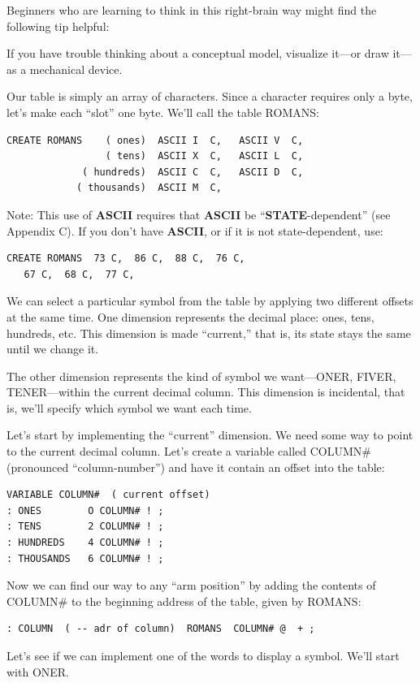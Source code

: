 Beginners who are learning to think in this right-brain way might
find the following tip helpful:

\begin{tip}
If you have trouble thinking about a conceptual model, visualize it---or
draw it---as a mechanical device.
\end{tip}
Our table is simply an array of characters. Since a character requires only
a byte, let's make each ``slot'' one byte. We'll call the table ROMANS:

\begin{verbatim}
CREATE ROMANS    ( ones)  ASCII I  C,   ASCII V  C,
                 ( tens)  ASCII X  C,   ASCII L  C,
             ( hundreds)  ASCII C  C,   ASCII D  C,
            ( thousands)  ASCII M  C,
\end{verbatim}
Note: This use of \textbf{ASCII} requires that \textbf{ASCII} be
``\textbf{STATE}-dependent'' (see Appendix C). If you don't have \textbf{ASCII},
or if it is not state-dependent, use:

\begin{verbatim}
CREATE ROMANS  73 C,  86 C,  88 C,  76 C,
   67 C,  68 C,  77 C,
\end{verbatim}

We can select a particular symbol from the table by applying two
different offsets at the same time. One dimension represents the decimal
place: ones, tens, hundreds, etc. This dimension is made ``current,'' that
is, its state stays the same until we change it.

The other dimension represents the kind of symbol we want---ONER,
FIVER, TENER---within the current decimal column. This
dimension is incidental, that is, we'll specify which symbol we want each
time.

Let's start by implementing the ``current'' dimension. We need
some way to point to the current decimal column. Let's create a variable
called COLUMN\# (pronounced ``column-number'') and have it contain an
offset into the table:

\begin{verbatim}
VARIABLE COLUMN#  ( current offset)
: ONES        O COLUMN# ! ;
: TENS        2 COLUMN# ! ;
: HUNDREDS    4 COLUMN# ! ;
: THOUSANDS   6 COLUMN# ! ;
\end{verbatim}
Now we can find our way to any ``arm position'' by adding the contents of
COLUMN\# to the beginning address of the table, given by ROMANS:

\begin{verbatim}
: COLUMN  ( -- adr of column)  ROMANS  COLUMN# @  + ;
\end{verbatim}
Let's see if we can implement one of the words to display a symbol. We'll
start with ONER.

